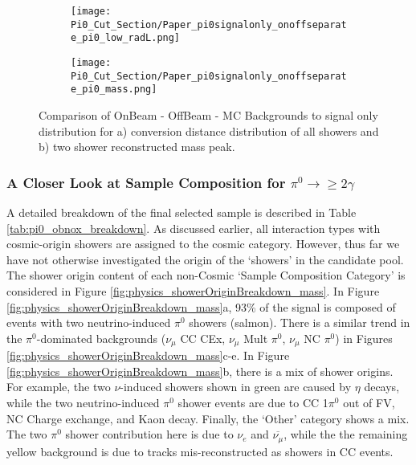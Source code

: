 \begin{figure}[H]
  \begin{subfigure}[t]{0.4\textwidth}
\texttt{[image: Pi0\_Cut\_Section/Paper\_pi0signalonly\_onoffseparate\_pi0\_low\_radL.png]}
  \caption{ }
  \end{subfigure} 
  \hspace{14mm}
  \begin{subfigure}[t]{0.4\textwidth}
\texttt{[image: Pi0\_Cut\_Section/Paper\_pi0signalonly\_onoffseparate\_pi0\_mass.png]}
  \caption{ }
  \end{subfigure} 

\caption{ Comparison of OnBeam - OffBeam - MC Backgrounds to signal only distribution for a) conversion distance distribution of all showers and b) two shower reconstructed mass peak.  }
\label{fig:physics_pi0signalonly_mass} 
\end{figure}


\clearpage
\subsubsection{A Closer Look at Sample Composition for $\pi^0\rightarrow\geq 2 \gamma$}
A detailed breakdown of the final selected sample is described in Table \ref{tab:pi0_obnox_breakdown}.  As discussed earlier, all interaction types with cosmic-origin showers are assigned to the cosmic category.  However, thus far we have not otherwise investigated the origin of the `showers' in the candidate pool. The shower origin content of each non-Cosmic `Sample Composition Category' is considered in Figure \ref{fig:physics_showerOriginBreakdown_mass}.  In Figure \ref{fig:physics_showerOriginBreakdown_mass}a, 93\% of the signal is composed of events with two neutrino-induced $\pi^0$ showers (salmon). There is a similar trend in the $\pi^0$-dominated backgrounds ($\nu_\mu$ CC CEx, $\nu_\mu$ Mult $\pi^0$, $\nu_\mu$ NC $\pi^0$) in Figures \ref{fig:physics_showerOriginBreakdown_mass}c-e.  In Figure \ref{fig:physics_showerOriginBreakdown_mass}b, there is a mix of shower origins. For example, the two $\nu$-induced showers shown in green are caused by $\eta$ decays, while the two neutrino-induced $\pi^0$ shower events are due to CC 1$\pi^0$ out of FV, NC Charge exchange, and Kaon decay. Finally, the `Other' category shows a mix.  The two $\pi^0$ shower contribution here is due to $\nu_e$ and $\overline{\nu_\mu}$, while the the remaining yellow background is due to tracks mis-reconstructed as showers in CC events.

